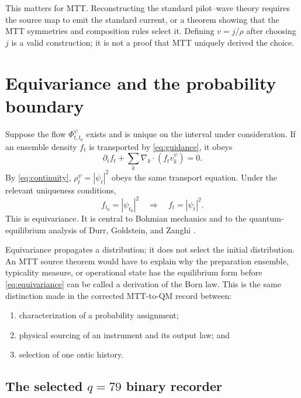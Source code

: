 \documentclass[11pt]{article}
\theoremstyle{definition}
\theoremstyle{remark}
\let\MTToriginalitem\item
\renewcommand{\item}{\par\MTToriginalitem}
\begin{document}
This matters for MTT.  Reconstructing the standard pilot--wave theory
requires the source map to emit the standard current, or a theorem showing
that the MTT symmetries and composition rules select it.  Defining
\(v=j/\rho\) after choosing \(j\) is a valid construction; it is not a proof
that MTT uniquely derived the choice.

\section{Equivariance and the probability boundary}
\label{sec:equivariance}

Suppose the flow \(\Phi^\psi_{t,t_0}\) exists and is unique on the interval
under consideration.  If an ensemble density \(f_t\) is transported by
\cref{eq:guidance}, it obeys
\[
\partial_tf_t+\sum_k\nabla_k\!\cdot(f_tv_k^\psi)=0.
\]
By \cref{eq:continuity}, \(\rho^\psi_t=|\psi_t|^2\) obeys the same transport
equation.  Under the relevant uniqueness conditions,
\begin{equation}
f_{t_0}=|\psi_{t_0}|^2
\quad\Longrightarrow\quad
f_t=|\psi_t|^2.
\label{eq:equivariance}
\end{equation}
This is equivariance.  It is central to Bohmian mechanics and to the
quantum-equilibrium analysis of Durr, Goldstein, and Zanghi
\cite{DurrGoldsteinZanghi1992}.

Equivariance propagates a distribution; it does not select the initial
distribution.  An MTT source theorem would have to explain why the
preparation ensemble, typicality measure, or operational state has the
equilibrium form before \cref{eq:equivariance} can be called a derivation of
the Born law.  This is the same distinction made in the corrected MTT-to-QM
record between:
\begin{enumerate}[leftmargin=2em]
\item characterization of a probability assignment;
\item physical sourcing of an instrument and its output law; and
\item selection of one ontic history.
\end{enumerate}

\subsection{The selected \texorpdfstring{\(q=79\)}{q=79} binary recorder}
\end{document}
